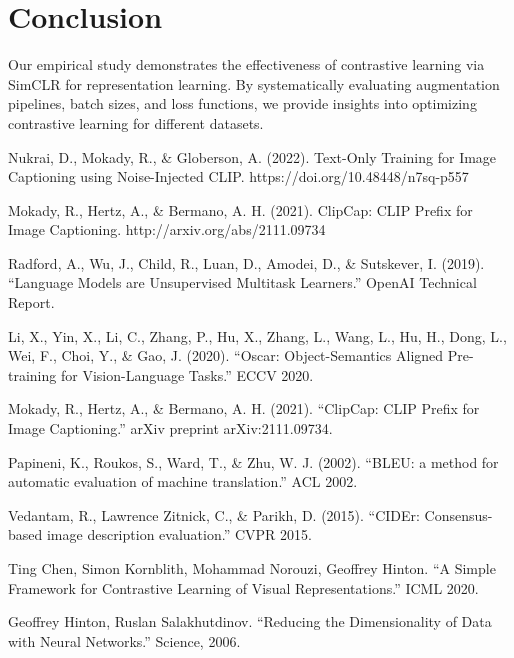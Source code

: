 \documentclass[11pt]{article}
\begin{document}
\section{Conclusion}
Our empirical study demonstrates the effectiveness of contrastive learning via SimCLR for representation
learning. By systematically evaluating augmentation pipelines, batch sizes, and loss functions, we provide
insights into optimizing contrastive learning for different datasets.
\pagebreak
\begin{thebibliography}{99}
    Nukrai, D., Mokady, R., \& Globerson, A. (2022). Text-Only Training for Image Captioning using Noise-Injected CLIP. https://doi.org/10.48448/n7sq-p557
    
    Mokady, R., Hertz, A., \& Bermano, A. H. (2021). ClipCap: CLIP Prefix for Image Captioning. http://arxiv.org/abs/2111.09734
    
    Radford, A., Wu, J., Child, R., Luan, D., Amodei, D., \& Sutskever, I. (2019). ``Language Models are Unsupervised Multitask Learners.'' OpenAI Technical Report.
    
    Li, X., Yin, X., Li, C., Zhang, P., Hu, X., Zhang, L., Wang, L., Hu, H., Dong, L., Wei, F., Choi, Y., \& Gao, J. (2020). ``Oscar: Object-Semantics Aligned Pre-training for Vision-Language Tasks.'' ECCV 2020.
    
    Mokady, R., Hertz, A., \& Bermano, A. H. (2021). ``ClipCap: CLIP Prefix for Image Captioning.'' arXiv preprint arXiv:2111.09734.
    
    Papineni, K., Roukos, S., Ward, T., \& Zhu, W. J. (2002). ``BLEU: a method for automatic evaluation of machine translation.'' ACL 2002.
    
    Vedantam, R., Lawrence Zitnick, C., \& Parikh, D. (2015). ``CIDEr: Consensus-based image description evaluation.'' CVPR 2015.
    
    Ting Chen, Simon Kornblith, Mohammad Norouzi, Geoffrey Hinton. ``A Simple Framework for Contrastive Learning of Visual Representations.'' ICML 2020.
    
    Geoffrey Hinton, Ruslan Salakhutdinov. ``Reducing the Dimensionality of Data with Neural Networks.'' Science, 2006.
    \end{thebibliography}
\end{document}
